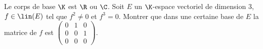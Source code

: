 \begin{enonce}
\begin{exercise}[ID={RMS133 E1291},subtitle={CCINP MP 2022},tags={mpsi},difficulty={}]
Le corps de base $\K$ est $\R$ ou $\C$.
  Soit $E$ un $\K$-espace vectoriel de dimension $3$, $f\in\lin(E)$ tel que $f^2\neq0$ et $f^3=0$.
  Montrer que dans une certaine base de $E$ la matrice de $f$ est $\begin{pmatrix} 0&1&0\\0&0&1\\0&0&0 \end{pmatrix}$.
\end{exercise}
\begin{solution}
\end{solution}
\end{enonce}

